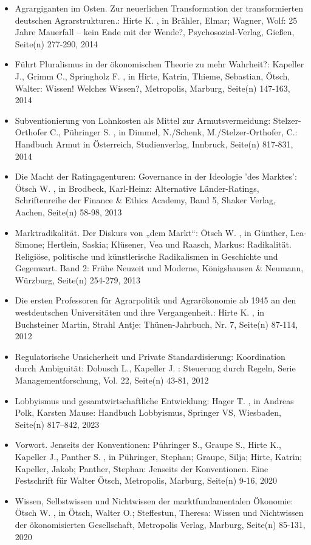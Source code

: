 \begin{itemize}
\item Agrargiganten im Osten. Zur neuerlichen Transformation der transformierten deutschen Agrarstrukturen.: Hirte K. , in Brähler, Elmar; Wagner, Wolf: 25 Jahre Mauerfall – kein Ende mit der Wende?, Psychosozial-Verlag, Gießen, Seite(n) 277-­290, 2014
\item Führt Pluralismus in der ökonomischen Theorie zu mehr Wahrheit?: Kapeller J., Grimm C., Springholz F. , in Hirte, Katrin, Thieme, Sebastian, Ötsch, Walter: Wissen! Welches Wissen?, Metropolis, Marburg, Seite(n) 147-163, 2014
\item Subventionierung von Lohnkosten als Mittel zur Armutsvermeidung: Stelzer-Orthofer C., Pühringer S. , in Dimmel, N./Schenk, M./Stelzer-Orthofer, C.: Handbuch Armut in Österreich, Studienverlag, Innbruck, Seite(n) 817-831, 2014
\item Die Macht der Ratingagenturen: Governance in der Ideologie 'des Marktes': Ötsch W. , in Brodbeck, Karl-Heinz: Alternative Länder-Ratings, Schriftenreihe der Finance & Ethics Academy, Band 5, Shaker Verlag, Aachen, Seite(n) 58-98, 2013
\item Marktradikalität. Der Diskurs von „dem Markt“: Ötsch W. , in Günther, Lea-Simone; Hertlein, Saskia;  Klüsener, Vea und Raasch, Markus: Radikalität. Religiöse, politische und künstlerische Radikalismen in Geschichte und Gegenwart.  Band 2: Frühe Neuzeit und Moderne, Königshausen & Neumann, Würzburg, Seite(n) 254-279, 2013
\item Die ersten Professoren für Agrarpolitik und Agrarökonomie ab 1945 an den westdeutschen Universitäten und ihre Vergangenheit.: Hirte K. , in Buchsteiner Martin, Strahl Antje: Thünen-Jahrbuch, Nr. 7, Seite(n) 87-114, 2012
\item Regulatorische Unsicherheit und Private Standardisierung: Koordination durch Ambiguität: Dobusch L., Kapeller J. : Steuerung durch Regeln, Serie Managementforschung, Vol. 22, Seite(n) 43-81, 2012
\item Lobbyismus und gesamtwirtschaftliche Entwicklung: Hager T. , in Andreas Polk, Karsten Mause: Handbuch Lobbyismus, Springer VS, Wiesbaden, Seite(n) 817–842, 2023
\item Vorwort. Jenseits der Konventionen: Pühringer S., Graupe S., Hirte K., Kapeller J., Panther S. , in Pühringer, Stephan; Graupe, Silja; Hirte, Katrin; Kapeller, Jakob; Panther, Stephan: Jenseits der Konventionen. Eine Festschrift für Walter Ötsch, Metropolis, Marburg, Seite(n) 9-16, 2020
\item Wissen, Selbstwissen und Nichtwissen der marktfundamentalen Ökonomie: Ötsch W. , in Ötsch, Walter O.; Steffestun, Theresa: Wissen und Nichtwissen der ökonomisierten Gesellschaft, Metropolis Verlag, Marburg, Seite(n) 85-131, 2020

\end{itemize}
